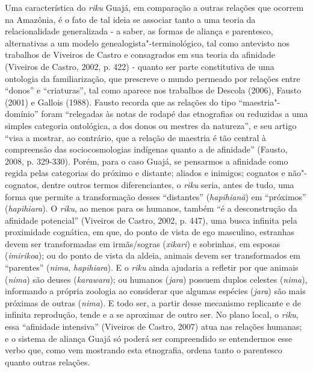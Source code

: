 Uma característica do \emph{riku} Guajá, em comparação a outras relações
que ocorrem na Amazônia, é o fato de tal ideia se associar tanto a uma
teoria da relacionalidade generalizada - a saber, as formas de aliança e
parentesco, alternativas a um modelo genealogista"-terminológico, tal
como antevisto nos trabalhos de Viveiros de Castro e consagrados em sua
teoria da afinidade (Viveiros de Castro, 2002, p. 422) - quanto ser
parte constitutiva de uma ontologia da familiarização, que prescreve o
mundo permeado por relações entre ``donos'' e ``criaturas'', tal como
aparece nos trabalhos de Descola (2006), Fausto (2001) e Gallois (1988).
Fausto recorda que as relações do tipo ``maestria"-domínio'' foram
``relegadas às notas de rodapé das etnografias ou reduzidas a uma simples
categoria ontológica, a dos donos ou mestres da natureza'', e seu artigo
``visa a mostrar, ao contrário, que a relação de maestria é tão central à
compreensão das sociocosmologias indígenas quanto a de afinidade''
(Fausto, 2008, p. 329-330). Porém, para o caso Guajá, se pensarmos a
afinidade como regida pelas categorias do próximo e distante; aliados e
inimigos; cognatos e não"-cognatos, dentre outros termos diferenciantes,
o \emph{riku} seria, antes de tudo, uma forma que permite a
transformação desses ``distantes'' (\emph{hapihianã}) em ``próximos''
(\emph{hapihiara}). O \emph{riku}, ao menos para os humanos, também ``é a
desconstrução da afinidade potencial'' (Viveiros de Castro, 2002, p.
447), uma busca infinita pela proximidade cognática, em que, do ponto de
vista de ego masculino, estranhas devem ser transformadas em
irmãs/sogras (\emph{xikari}) e sobrinhas, em esposas (\emph{imirikoa});
ou do ponto de vista da aldeia, animais devem ser transformados em
``parentes'' (\emph{nima}, \emph{hapihiara}). E o \emph{riku} ainda
ajudaria a refletir por que animais (\emph{nima}) são deuses
(\emph{karawara}); ou humanos (\emph{jara}) possuem duplos celestes
(\emph{nima}), informando a própria zoologia ao considerar que algumas
espécies (\emph{jara}) são mais próximas de outras (\emph{nima}). E todo
ser, a partir desse mecanismo replicante e de infinita reprodução, tende
e a se aproximar de outro ser. No plano local, o \emph{riku}, essa
``afinidade intensiva'' (Viveiros de Castro, 2007) atua nas relações
humanas; e o sistema de aliança Guajá só poderá ser compreendido se
entendermos esse verbo que, como vem mostrando esta etnografia, ordena
tanto o parentesco quanto outras relações.


